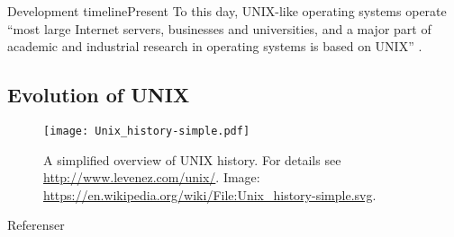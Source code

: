 \documentclass{beamer}
\begin{document}
\begin{frame}{Development timeline}{Present}
	To this day, UNIX-like operating systems operate ``most large Internet 
	servers, businesses and universities, and a major part of academic and 
	industrial research in operating systems is based on UNIX'' 
	\cite{BellLabs2002tco}.
\end{frame}

\subsection{Evolution of UNIX}

\begin{frame}{\insertsubsectionhead}
  \begin{figure}
    \texttt{[image: Unix\_history-simple.pdf]}
    \caption{A simplified overview of UNIX history.
    For details see \url{http://www.levenez.com/unix/}.
    Image: \url{https://en.wikipedia.org/wiki/File:Unix_history-simple.svg}.
  }
  \end{figure}
\end{frame}



\begin{frame}[allowframebreaks]{Referenser}
  \small
  \printbibliography
\end{frame}
\end{document}
